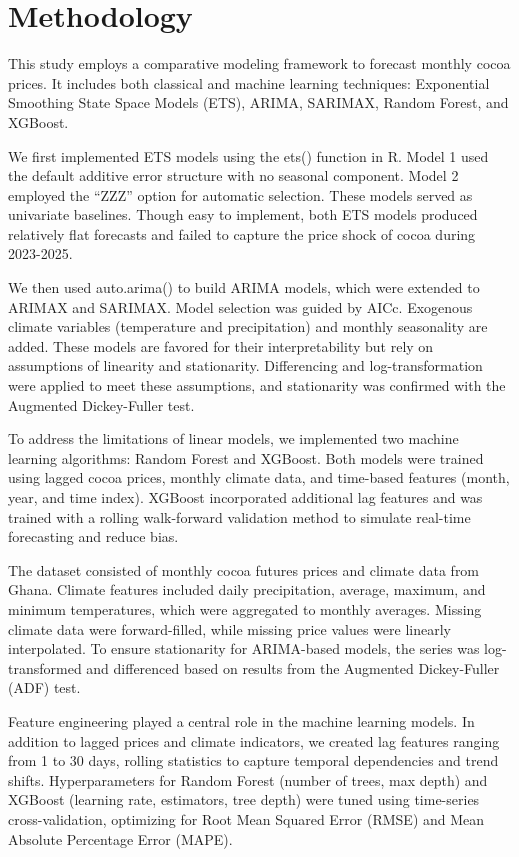 \documentclass[
  letterpaper,
  DIV=11,
  numbers=noendperiod]{scrartcl}
\begin{document}
\hypertarget{methodology}{%
\section{Methodology}\label{methodology}}

This study employs a comparative modeling framework to forecast monthly
cocoa prices. It includes both classical and machine learning
techniques: Exponential Smoothing State Space Models (ETS), ARIMA,
SARIMAX, Random Forest, and XGBoost.

We first implemented ETS models using the ets() function in R. Model 1
used the default additive error structure with no seasonal component.
Model 2 employed the ``ZZZ'' option for automatic selection. These
models served as univariate baselines. Though easy to implement, both
ETS models produced relatively flat forecasts and failed to capture the
price shock of cocoa during 2023-2025.

We then used auto.arima() to build ARIMA models, which were extended to
ARIMAX and SARIMAX. Model selection was guided by AICc. Exogenous
climate variables (temperature and precipitation) and monthly
seasonality are added. These models are favored for their
interpretability but rely on assumptions of linearity and stationarity.
Differencing and log-transformation were applied to meet these
assumptions, and stationarity was confirmed with the Augmented
Dickey-Fuller test.

To address the limitations of linear models, we implemented two machine
learning algorithms: Random Forest and XGBoost. Both models were trained
using lagged cocoa prices, monthly climate data, and time-based features
(month, year, and time index). XGBoost incorporated additional lag
features and was trained with a rolling walk-forward validation method
to simulate real-time forecasting and reduce bias.

The dataset consisted of monthly cocoa futures prices and climate data
from Ghana. Climate features included daily precipitation, average,
maximum, and minimum temperatures, which were aggregated to monthly
averages. Missing climate data were forward-filled, while missing price
values were linearly interpolated. To ensure stationarity for
ARIMA-based models, the series was log-transformed and differenced based
on results from the Augmented Dickey-Fuller (ADF) test.

Feature engineering played a central role in the machine learning
models. In addition to lagged prices and climate indicators, we created
lag features ranging from 1 to 30 days, rolling statistics to capture
temporal dependencies and trend shifts. Hyperparameters for Random
Forest (number of trees, max depth) and XGBoost (learning rate,
estimators, tree depth) were tuned using time-series cross-validation,
optimizing for Root Mean Squared Error (RMSE) and Mean Absolute
Percentage Error (MAPE).
\end{document}
